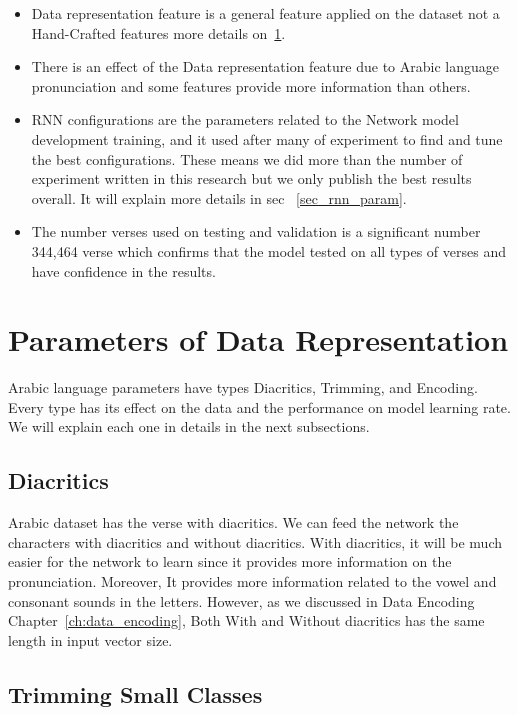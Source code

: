\begin{itemize}
	\item Data representation feature is a general feature applied on the dataset not a Hand-Crafted features more details on~\ref{sec_data_rep_param}.
	\item There is an effect of the Data representation feature due to Arabic language pronunciation and some features provide more information than others.
	\item RNN configurations are the parameters related to the Network model development training, and it used after many of experiment to find and tune the best configurations. These means we did more than the number of experiment written in this research but we only publish the best results overall. It will explain more details in sec ~\ref{sec_rnn_param}.
	\item The number verses used on testing and validation is a significant number 344,464 verse which confirms that the model tested on all types of verses and have confidence in the results.

\end{itemize}

\section{Parameters of Data Representation}\label{sec_data_rep_param}

Arabic language parameters have types Diacritics, Trimming, and Encoding. Every type has its effect on the data and the performance on model learning rate. We will explain each one in details in the next subsections.

\subsection{Diacritics}

Arabic dataset has the verse with diacritics. We can feed the network the characters with diacritics and without diacritics. With diacritics, it will be much easier for the network to learn since it provides more information on the pronunciation. Moreover, It provides more information related to the vowel and consonant sounds in the letters. However, as we discussed in Data Encoding Chapter~\ref{ch:data_encoding}, Both With and Without diacritics has the same length in input vector size.

\subsection{Trimming Small Classes}

